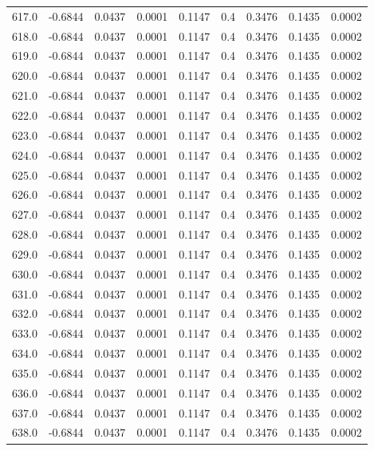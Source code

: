 \begin{longtable}{lrrrrrrrr}
617.0 & -0.6844 & 0.0437 & 0.0001 & 0.1147 & 0.4 & 0.3476 & 0.1435 & 0.0002 \\
618.0 & -0.6844 & 0.0437 & 0.0001 & 0.1147 & 0.4 & 0.3476 & 0.1435 & 0.0002 \\
619.0 & -0.6844 & 0.0437 & 0.0001 & 0.1147 & 0.4 & 0.3476 & 0.1435 & 0.0002 \\
620.0 & -0.6844 & 0.0437 & 0.0001 & 0.1147 & 0.4 & 0.3476 & 0.1435 & 0.0002 \\
621.0 & -0.6844 & 0.0437 & 0.0001 & 0.1147 & 0.4 & 0.3476 & 0.1435 & 0.0002 \\
622.0 & -0.6844 & 0.0437 & 0.0001 & 0.1147 & 0.4 & 0.3476 & 0.1435 & 0.0002 \\
623.0 & -0.6844 & 0.0437 & 0.0001 & 0.1147 & 0.4 & 0.3476 & 0.1435 & 0.0002 \\
624.0 & -0.6844 & 0.0437 & 0.0001 & 0.1147 & 0.4 & 0.3476 & 0.1435 & 0.0002 \\
625.0 & -0.6844 & 0.0437 & 0.0001 & 0.1147 & 0.4 & 0.3476 & 0.1435 & 0.0002 \\
626.0 & -0.6844 & 0.0437 & 0.0001 & 0.1147 & 0.4 & 0.3476 & 0.1435 & 0.0002 \\
627.0 & -0.6844 & 0.0437 & 0.0001 & 0.1147 & 0.4 & 0.3476 & 0.1435 & 0.0002 \\
628.0 & -0.6844 & 0.0437 & 0.0001 & 0.1147 & 0.4 & 0.3476 & 0.1435 & 0.0002 \\
629.0 & -0.6844 & 0.0437 & 0.0001 & 0.1147 & 0.4 & 0.3476 & 0.1435 & 0.0002 \\
630.0 & -0.6844 & 0.0437 & 0.0001 & 0.1147 & 0.4 & 0.3476 & 0.1435 & 0.0002 \\
631.0 & -0.6844 & 0.0437 & 0.0001 & 0.1147 & 0.4 & 0.3476 & 0.1435 & 0.0002 \\
632.0 & -0.6844 & 0.0437 & 0.0001 & 0.1147 & 0.4 & 0.3476 & 0.1435 & 0.0002 \\
633.0 & -0.6844 & 0.0437 & 0.0001 & 0.1147 & 0.4 & 0.3476 & 0.1435 & 0.0002 \\
634.0 & -0.6844 & 0.0437 & 0.0001 & 0.1147 & 0.4 & 0.3476 & 0.1435 & 0.0002 \\
635.0 & -0.6844 & 0.0437 & 0.0001 & 0.1147 & 0.4 & 0.3476 & 0.1435 & 0.0002 \\
636.0 & -0.6844 & 0.0437 & 0.0001 & 0.1147 & 0.4 & 0.3476 & 0.1435 & 0.0002 \\
637.0 & -0.6844 & 0.0437 & 0.0001 & 0.1147 & 0.4 & 0.3476 & 0.1435 & 0.0002 \\
638.0 & -0.6844 & 0.0437 & 0.0001 & 0.1147 & 0.4 & 0.3476 & 0.1435 & 0.0002 \\

\end{longtable}
